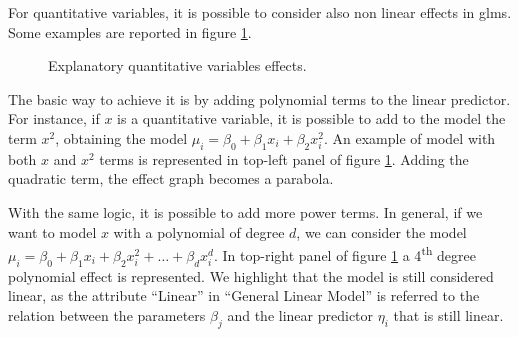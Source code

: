\documentclass[a4paper, twoside, openright, 12pt]{report}
\theoremstyle{definition}
\theoremstyle{definition}
\theoremstyle{definition}
\theoremstyle{remark}
\begin{document}
For quantitative variables, it is possible to consider also non linear effects in \ac{glm}s. Some examples are reported in figure \ref{fig:expl-var-quant-effect}.





\begin{figure}[!hbtp]

{\centering {}\newline{}

}

\caption{Explanatory quantitative variables effects.}\label{fig:expl-var-quant-effect}
\end{figure}

The basic way to achieve it is by adding polynomial terms to the linear predictor. For instance, if \(x\) is a quantitative variable, it is possible to add to the model the term \(x^2\), obtaining the model \(\mu_i = \beta_0 + \beta_1 x_{i} + \beta_2 x_i^2\). An example of model with both \(x\) and \(x^2\) terms is represented in top-left panel of figure \ref{fig:expl-var-quant-effect}. Adding the quadratic term, the effect graph becomes a parabola.

With the same logic, it is possible to add more power terms. In general, if we want to model \(x\) with a polynomial of degree \(d\), we can consider the model \(\mu_i = \beta_0 + \beta_1 x_{i} + \beta_2 x_{i}^2 + \dots + \beta_d x_{i}^d\). In top-right panel of figure \ref{fig:expl-var-quant-effect} a 4\textsuperscript{th} degree polynomial effect is represented. We highlight that the model is still considered linear, as the attribute ``Linear'' in ``General Linear Model'' is referred to the relation between the parameters \(\beta_j\) and the linear predictor \(\eta_i\) that is still linear.
\end{document}
